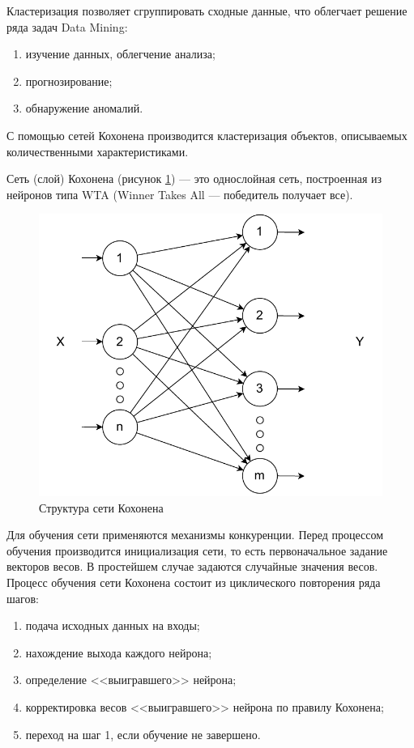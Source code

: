 Кластеризация позволяет сгруппировать сходные данные, что облегчает решение ряда задач Data Mining: 
\begin{enumerate}
	\item[1)] изучение данных, облегчение анализа;
	\item[2)] прогнозирование;
	\item[3)] обнаружение аномалий.
\end{enumerate}

С помощью сетей Кохонена производится кластеризация объектов, описываемых количественными характеристиками. 

Сеть (слой) Кохонена (рисунок \ref{fig:kohonen}) — это однослойная сеть, построенная из
нейронов типа WTA (Winner Takes All — победитель получает все).

\begin{figure}[hbtp]
	\centering
	\includegraphics[scale=1]{img/koh.pdf}
	\caption{Структура сети Кохонена\cite{koh}}
	\label{fig:kohonen}
\end{figure}

Для обучения сети применяются механизмы конкуренции. Перед процессом обучения производится инициализация сети, то есть первоначальное задание векторов весов. В простейшем случае задаются случайные значения весов. Процесс обучения сети Кохонена состоит из циклического повторения ряда шагов: 
\begin{enumerate}
	\item[1)] подача исходных данных на входы;
	\item[2)] нахождение выхода каждого нейрона;
	\item[3)] определение <<выигравшего>> нейрона;
	\item[4)] корректировка весов <<выигравшего>> нейрона по правилу Кохонена;
	\item[5)] переход на шаг 1, если обучение не завершено.
\end{enumerate}

